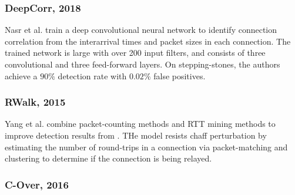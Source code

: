 \documentclass[runningheads,11pt]{llncs}\usepackage[]{graphicx}\usepackage[]{color}
\begin{document}
\vspace{-0.6cm}
\subsubsection{DeepCorr, 2018}

Nasr et al. \cite{nasr2018deepcorr} train a deep convolutional neural network to identify connection correlation from the interarrival times and packet sizes in each connection. The trained network is large with over 200 input filters, and consists of three convolutional and three feed-forward layers. %
On stepping-stones, the authors achieve a $90\%$ detection rate with $0.02 \%$ false positives. 

\vspace{-0.6cm}
\subsubsection{RWalk, 2015}


Yang et al. \cite{yang2015rtt} combine packet-counting methods and RTT mining methods to improve detection results from \cite{yang2007mining}. 
THe model resists chaff perturbation by estimating the number of round-trips in a connection via packet-matching and clustering to determine if the connection is being relayed.

\vspace{-0.6cm}
\subsubsection{C-Over, 2016}
\end{document}
